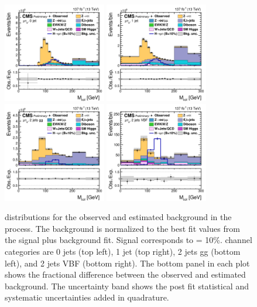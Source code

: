 \begin{figure}[htbp!]
  \centering
  \includegraphics[width=0.4\textwidth]{plots/chapter9/CB/mue/0jet.png}
  \includegraphics[width=0.4\textwidth]{plots/chapter9/CB/mue/1jet.png} \\
  \includegraphics[width=0.4\textwidth]{plots/chapter9/CB/mue/2jet_gg.png}
  \includegraphics[width=0.4\textwidth]{plots/chapter9/CB/mue/2jet_vbf.png} \\
  \caption{\mcol distributions for the observed and estimated background in the \Hmue process. The background is normalized to the best fit values from the signal plus background fit. Signal corresponds to \BHmt = 10\%. \Hmue channel categories are 0 jets (top left), 1 jet (top right), 2 jets gg (bottom left), and 2 jets VBF (bottom right). The bottom panel in each plot shows the fractional difference between the observed and estimated background. The uncertainty band shows the post fit statistical and systematic uncertainties added in quadrature.}
  \label{fig:mcol_mue}
\end{figure}

